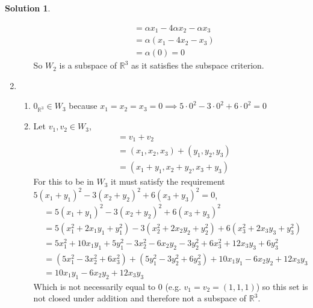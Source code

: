 \documentclass[10pt]{article}
\theoremstyle{definition}
\newtheorem{soln}{Solution}
\begin{document}
\begin{soln}
\begin{enumerate}[label=(\alph*)]
\begin{enumerate}[label=(\roman*)]
\begin{align*}
                     & = \alpha x_1-4\alpha x_2-\alpha x_3 \\
                     & = \alpha(x_1-4 x_2- x_3)            \\
                     & = \alpha(0)=0
                  \end{align*}
                  So $W_2$ is a subspace of $\mathbb{R}^3$ as it satisfies the subspace criterion.
          \end{enumerate}
    \item \begin{enumerate}[label=(\roman*)]
            \item $0_{\mathbb{R}^3}\in W_3$ because $x_1=x_2=x_3=0\implies 5\cdot0^2-3\cdot0^2+6\cdot0^2=0$
            \item Let $v_1,v_2\in W_3$,
                  \begin{align*}
                     & = v_1+v_2                     \\
                     & = (x_1,x_2,x_3)+(y_1,y_2,y_3) \\
                     & = (x_1+y_1,x_2+y_2,x_3+y_3)
                  \end{align*}
                  For this to be in $W_3$ it must satisfy the requirement $5(x_1+y_1)^2-3(x_2+y_2)^2+6(x_3+y_3)^2=0$,
                  \begin{align*}
                     & = 5(x_1+y_1)^2-3(x_2+y_2)^2+6(x_3+y_3)^2                                  \\
                     & = 5(x_1^2+2x_1y_1+y_1^2)-3(x_2^2+2x_2y_2+y_2^2)+6(x_3^2+2x_3y_3+y_3^2)    \\
                     & = 5x_1^2+10x_1y_1+5y_1^2-3x_2^2-6x_2y_2-3y_2^2+6x_3^2+12x_3y_3+6y_3^2     \\
                     & = (5x_1^2-3x_2^2+6x_3^2)+(5y_1^2-3y_2^2+6y_3^2)+10x_1y_1-6x_2y_2+12x_3y_3 \\
                     & = 10x_1y_1-6x_2y_2+12x_3y_3 
                  \end{align*}
                  Which is not necessarily equal to 0 (e.g. $v_1=v_2=(1,1,1)$) so this set is not closed under addition and therefore not a subspace of $\mathbb{R}^3$.
          \end{enumerate}
  \end{enumerate}
\end{soln}
\end{document}

